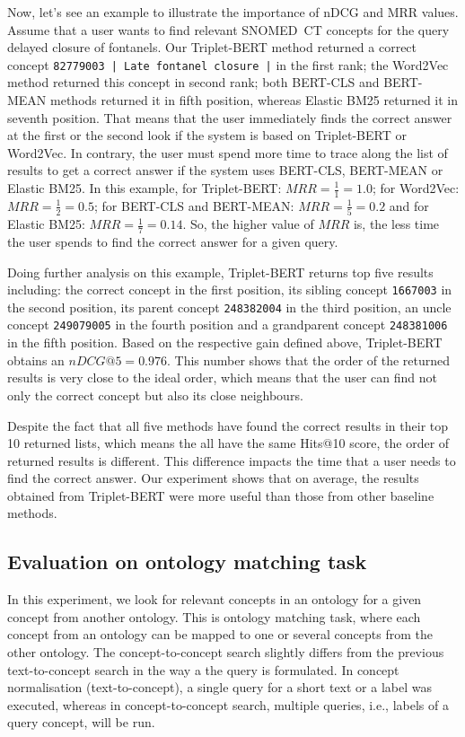 \documentclass[preprint,12pt]{elsarticle}
\begin{document}
Now, let's see an example to illustrate the importance of nDCG and MRR values. Assume that a user wants to find relevant SNOMED~CT concepts for the query {delayed closure of fontanels}. Our Triplet-BERT method returned a correct concept \texttt{82779003 | Late fontanel closure |} in the first rank;  the Word2Vec method returned this concept in second rank; both BERT-CLS and BERT-MEAN methods returned it in fifth position, whereas Elastic BM25 returned it in seventh position. That means that the user immediately finds the correct answer at the first or the second look if the system is based on Triplet-BERT or Word2Vec. In contrary, the user must spend more time to trace along the list of results to get a correct answer if the system uses BERT-CLS, BERT-MEAN or Elastic BM25. In this example, for Triplet-BERT: $MRR = \frac{1}{1}=1.0$; for Word2Vec: $MRR = \frac{1}{2}=0.5$; for BERT-CLS and BERT-MEAN: $MRR = \frac{1}{5}=0.2$ and for Elastic BM25: $MRR = \frac{1}{7}=0.14$. So, the higher value of $MRR$ is, the less time the user spends to find the correct answer for a given query.

Doing further analysis on this example, Triplet-BERT returns top five results including: the correct concept in the first position, its sibling concept \texttt{1667003} in the second position, its parent concept \texttt{248382004} in the third position, an uncle concept \texttt{249079005} in the fourth position and a grandparent concept \texttt{248381006} in the fifth position. Based on the respective gain defined above, Triplet-BERT obtains an $nDCG@5 = 0.976$. This number shows that the order of the returned results is very close to the ideal order, which means that the user can find not only the correct concept but also its close neighbours. 

Despite the fact that all five methods have found the correct results in their top 10 returned lists, which means the all have the same Hits@10 score, the order of returned results is different. This difference impacts the time that a user needs to find the correct answer. Our experiment shows that on average, the results obtained from Triplet-BERT were more useful than those from other baseline methods.


\subsection*{Evaluation on ontology matching task}
\label{sec:Concept2Concept}

In this experiment, we look for relevant concepts in an ontology for a given concept from  another ontology. This is ontology matching task, where each concept from an ontology can be mapped to one or several concepts from the other ontology. The concept-to-concept search slightly differs from the previous text-to-concept search in the way a the query is formulated. In concept normalisation (text-to-concept), a single query for a short text or a label was executed, whereas in concept-to-concept search, multiple queries, i.e., labels of a query concept, will be run. 
\end{document}
